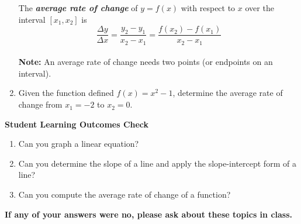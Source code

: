 \documentclass[11pt]{article}
\begin{document}
\begin{enumerate}
 The \textbf{\emph{average rate of change}} of $y=f(x)$ with respect to $x$ over the interval $[x_1,x_2]$ is
 $$\frac{\Delta y}{\Delta x}=\frac{y_2-y_1}{x_2-x_1}=\frac{f(x_2)-f(x_1)}{x_2-x_1}$$\\ 
 
\noindent \textbf{Note:  }An average rate of change needs two points (or endpoints on an interval). 






\item Given the function defined $f(x)=x^2-1$, determine the average rate of change from $x_1=-2$ to $x_2=0.$\\[2in]


\end{enumerate}

\noindent \textbf{Student Learning Outcomes Check}

\begin{enumerate}
\item Can you graph a linear equation?
\item Can you determine the slope of a line and apply the slope-intercept form of a line?
\item Can you compute the average rate of change of a function?
\end{enumerate}

\noindent \textbf{If any of your answers were no, please ask about these topics in class.}
\end{document}
